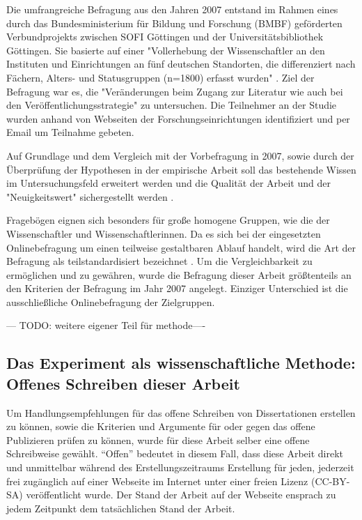 Die umfrangreiche Befragung aus den Jahren 2007 entstand im Rahmen eines durch das Bundesministerium für Bildung und Forschung (BMBF) geförderten Verbundprojekts zwischen SOFI Göttingen und der Universitätsbibliothek Göttingen. Sie basierte auf einer "Vollerhebung der Wissenschaftler an den Instituten und Einrichtungen an fünf deutschen Standorten, die differenziert nach Fächern, Alters- und Statusgruppen (n=1800) erfasst wurden" \cite{Hanekop_2014}. Ziel der Befragung war es, die "Veränderungen beim Zugang zur Literatur wie auch bei den Veröffentlichungsstrategie" \cite{Hanekop_Wittke_2007_Fragebogen} zu untersuchen. Die Teilnehmer an der Studie wurden anhand von Webseiten der Forschungseinrichtungen identifiziert und per Email um Teilnahme gebeten. 

Auf Grundlage und dem Vergleich mit der Vorbefragung in 2007, sowie durch der Überprüfung der Hypothesen in der empirische Arbeit soll das bestehende Wissen im Untersuchungsfeld erweitert werden und die Qualität der Arbeit und der "Neuigkeitswert" sichergestellt werden \cite{raab_2012_fragebogen}.

Fragebögen eignen sich besonders für große homogene Gruppen, wie die der Wissenschaftler und Wissenschaftlerinnen. Da es sich bei der eingesetzten Onlinebefragung um einen teilweise gestaltbaren Ablauf handelt, wird die Art der Befragung als teilstandardisiert bezeichnet \cite{raab_2012_fragebogen}. Um die Vergleichbarkeit zu ermöglichen und zu gewähren, wurde die Befragung dieser Arbeit größtenteils an den Kriterien der Befragung im Jahr 2007 angelegt. Einziger Unterschied ist die ausschließliche Onlinebefragung der Zielgruppen.

--- TODO: weitere eigener Teil für methode----

\subsection{Das Experiment als wissenschaftliche Methode: Offenes Schreiben dieser Arbeit}
Um Handlungsempfehlungen für das offene Schreiben von Dissertationen erstellen zu können, sowie die Kriterien und Argumente für oder gegen das offene Publizieren prüfen zu können, wurde für diese Arbeit selber eine offene Schreibweise gewählt. “Offen” bedeutet in diesem Fall, dass diese Arbeit direkt und unmittelbar während des Erstellungszeitraums Erstellung für jeden, jederzeit frei zugänglich auf einer Webseite im Internet unter einer freien Lizenz (CC-BY-SA) veröffentlicht wurde. Der Stand der Arbeit auf der Webseite ensprach zu jedem Zeitpunkt dem tatsächlichen Stand der Arbeit. 

